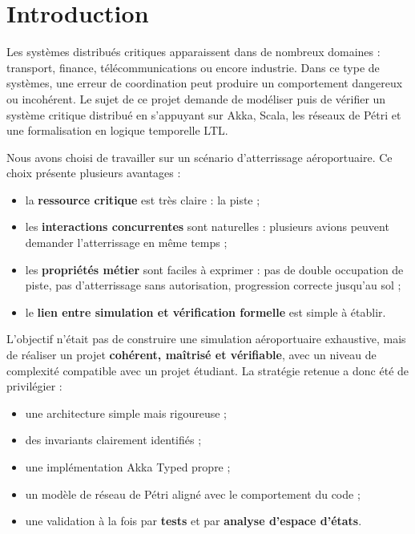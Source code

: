 \documentclass[11pt,a4paper]{article}
\begin{document}
\tableofcontents
\clearpage
{}
\section{Introduction}

Les systèmes distribués critiques apparaissent dans de nombreux domaines : transport, finance, télécommunications ou encore industrie. Dans ce type de systèmes, une erreur de coordination peut produire un comportement dangereux ou incohérent. Le sujet de ce projet demande de modéliser puis de vérifier un système critique distribué en s'appuyant sur Akka, Scala, les réseaux de Pétri et une formalisation en logique temporelle LTL.

Nous avons choisi de travailler sur un scénario d'atterrissage aéroportuaire. Ce choix présente plusieurs avantages :
\begin{itemize}
    \item la \textbf{ressource critique} est très claire : la piste ;
    \item les \textbf{interactions concurrentes} sont naturelles : plusieurs avions peuvent demander l'atterrissage en même temps ;
    \item les \textbf{propriétés métier} sont faciles à exprimer : pas de double occupation de piste, pas d'atterrissage sans autorisation, progression correcte jusqu'au sol ;
    \item le \textbf{lien entre simulation et vérification formelle} est simple à établir.
\end{itemize}

L'objectif n'était pas de construire une simulation aéroportuaire exhaustive, mais de réaliser un projet \textbf{cohérent, maîtrisé et vérifiable}, avec un niveau de complexité compatible avec un projet étudiant. La stratégie retenue a donc été de privilégier :
\begin{itemize}
    \item une architecture simple mais rigoureuse ;
    \item des invariants clairement identifiés ;
    \item une implémentation Akka Typed propre ;
    \item un modèle de réseau de Pétri aligné avec le comportement du code ;
    \item une validation à la fois par \textbf{tests} et par \textbf{analyse d'espace d'états}.
\end{itemize}
\end{document}
